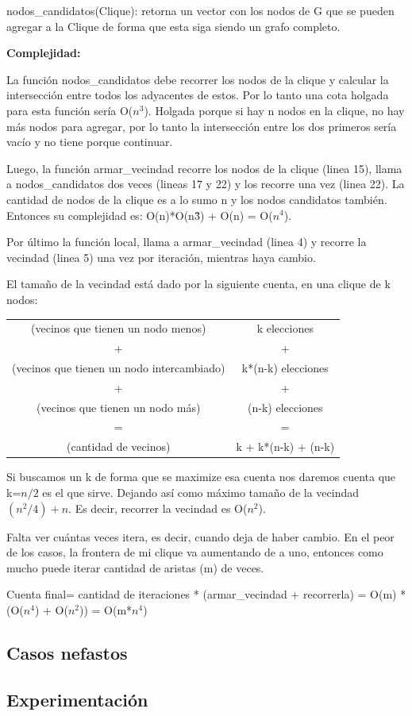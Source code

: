 nodos\_candidatos(Clique): retorna un vector con los nodos de G que se pueden agregar a la Clique de forma que esta siga siendo un grafo completo.

\textbf{Complejidad: }

La función nodos\_candidatos debe recorrer los nodos de la clique y calcular la intersección entre todos los adyacentes de estos. Por lo tanto una cota holgada para esta función sería O($n^3$). 
Holgada porque si hay n nodos en la clique, no hay más nodos para agregar, por lo tanto la intersección entre los dos primeros sería vacío y no tiene porque continuar.

Luego, la función armar\_vecindad recorre los nodos de la clique (linea 15), llama a nodos\_candidatos dos veces (lineas 17 y 22) y los recorre una vez (linea 22). 
La cantidad de nodos de la clique es a lo sumo n y los nodos candidatos también. Entonces su complejidad es: O(n)*O(n\^{3}) + O(n) = O($n^4$).

Por último la función local, llama a armar\_vecindad (linea 4) y recorre la vecindad (linea 5) una vez por iteración, mientras haya cambio.

El tamaño de la vecindad está dado por la siguiente cuenta, en una clique de k nodos:

\begin{center}
\begin{tabular}{  c  c  }
(vecinos que tienen un nodo menos) & k elecciones
\\ + & + \\ 
(vecinos que tienen un nodo intercambiado) & k*(n-k) elecciones
\\ + & + \\ 
(vecinos que tienen un nodo más) & (n-k) elecciones
\\ = & = \\
(cantidad de vecinos) & k + k*(n-k) + (n-k)
\end{tabular}
\end{center}

Si buscamos un k de forma que se maximize esa cuenta nos daremos cuenta que k=$n/2$ es el que sirve. Dejando así como máximo tamaño de la vecindad $(n^2/4) +n$. Es decir, recorrer la vecindad es O($n^2$).

Falta ver cuántas veces itera, es decir, cuando deja de haber cambio. En el peor de los casos, la frontera de mi clique va aumentando de a uno, entonces como mucho puede iterar cantidad de aristas (m) de veces.

Cuenta final= cantidad de iteraciones * (armar\_vecindad + recorrerla) = O(m) * (O($n^4$) + O($n^2$)) = O(m*$n^4$)

\subsection{Casos nefastos}


\subsection{Experimentaci\'on}




